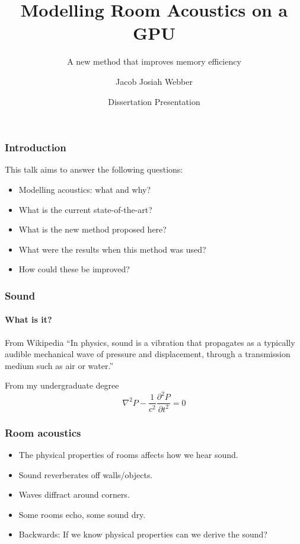 \documentclass{beamer}
\title[acoustics] %
{Modelling Room Acoustics on a GPU}
\subtitle{A new method that improves memory efficiency}
\author[Author] %
{Jacob Josiah Webber}
\date[22 August 2017] %
{Dissertation Presentation}
\begin{document}
\frame{\titlepage}

\begin{frame}
	\frametitle{Introduction}
	This talk aims to answer the following questions:
	\begin{itemize}
		\item Modelling acoustics: what and why?
		\item What is the current state-of-the-art?
		\item What is the new method proposed here?
		\item What were the results when this method was used?
		\item How could these be improved?
	\end{itemize}
\end{frame}



\begin{frame}
	\frametitle{Sound}
	\framesubtitle{What is it?}
	\begin{block}{From Wikipedia}
		``In physics, sound is a vibration that propagates as a typically audible mechanical wave of pressure and displacement, through a transmission medium such as air or water.''
	\end{block}
	\begin{block}{From my undergraduate degree}
		\begin{equation}
			\nabla^{2} P - \frac{1}{{c^2 }}\frac{{\partial ^2 P}}{{\partial t^2 }} = 0
		\end{equation}
	\end{block}
\end{frame}
  
  
\begin{frame}
	\frametitle{Room acoustics}
	\begin{itemize}
		\item The physical properties of rooms affects how we hear sound.
		\item Sound reverberates off walls/objects.
		\item Waves diffract around corners.
		\item Some rooms echo, some sound dry.
		\item Backwards: If we know physical properties can we derive the sound?
	\end{itemize}
\end{frame}
  
\end{document}
